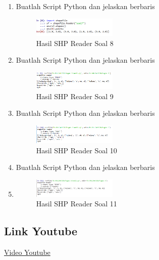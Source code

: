 \begin{enumerate}
    \item Buatlah Script Python dan jelaskan berbaris
    
    \hfill\break
    \begin{figure}[H]
		\includegraphics[width=4cm]{figures/1174004/3/8.png}
		\centering
		\caption{Hasil SHP Reader Soal 8}
    \end{figure}

    \item Buatlah Script Python dan jelaskan berbaris
    
    \hfill\break
    \begin{figure}[H]
		\includegraphics[width=4cm]{figures/1174004/3/9.png}
		\centering
		\caption{Hasil SHP Reader Soal 9}
    \end{figure}

    \item Buatlah Script Python dan jelaskan berbaris
    
    \hfill\break
    \begin{figure}[H]
		\includegraphics[width=4cm]{figures/1174004/3/10.png}
		\centering
		\caption{Hasil SHP Reader Soal 10}
    \end{figure}

    \item Buatlah Script Python dan jelaskan berbaris
    \item 
    \hfill\break
    \begin{figure}[H]
		\includegraphics[width=4cm]{figures/1174004/3/11.png}
		\centering
		\caption{Hasil SHP Reader Soal 11}
    \end{figure}
\end{enumerate}
\subsection{Link Youtube}
\href{https://www.youtube.com/watch?v=6XXwp9FaEyA}{Video Youtube}